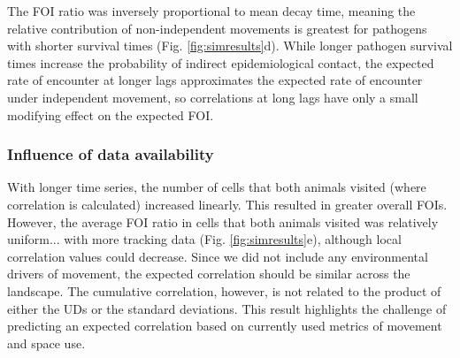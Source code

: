\documentclass[letterpaper]{article}
\begin{document}
The FOI ratio was inversely proportional to mean decay time, meaning the relative contribution of non-independent movements is greatest for pathogens with shorter survival times (Fig. \ref{fig:simresults}d). While longer pathogen survival times increase the probability of indirect epidemiological contact, the expected rate of encounter at longer lags approximates the expected rate of encounter under independent movement, so correlations at long lags have only a small modifying effect on the expected FOI. %


\subsubsection*{Influence of data availability}

With longer time series, the number of cells that both animals visited (where correlation is calculated) increased linearly. This resulted in greater overall FOIs. However, the average FOI ratio in cells that both animals visited was relatively uniform...   %
with more tracking data (Fig. \ref{fig:simresults}e), although local correlation values could decrease. 
Since we did not include any environmental drivers of movement, the expected correlation should be similar across the landscape. 
The cumulative correlation, however, is not related to the product of either the UDs or the standard deviations. This result highlights the challenge of predicting an expected correlation based on currently used metrics of movement and space use.

\end{document}

